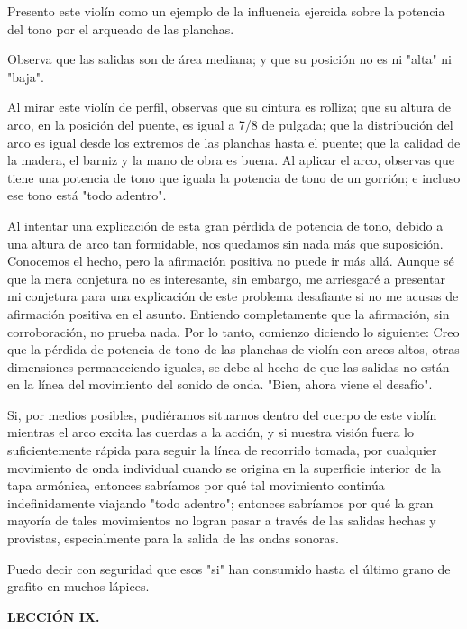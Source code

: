 \documentclass[12pt]{book}
\begin{document}
Presento este violín como un ejemplo de la influencia ejercida sobre la potencia del tono por el arqueado de las planchas.

Observa que las salidas son de área mediana; y que su posición no es ni "alta" ni "baja".

Al mirar este violín de perfil, observas que su cintura es rolliza; que su altura de arco, en la posición del puente, es igual a 7/8 de pulgada; que la distribución del arco es igual desde los extremos de las planchas hasta el puente; que la calidad de la madera, el barniz y la mano de obra es buena. Al aplicar el arco, observas que tiene una potencia de tono que iguala la potencia de tono de un gorrión; e incluso ese tono está "todo adentro".

Al intentar una explicación de esta gran pérdida de potencia de tono, debido a una altura de arco tan formidable, nos quedamos sin nada más que suposición. Conocemos el hecho, pero la afirmación positiva no puede ir más allá. Aunque sé que la mera conjetura no es interesante, sin embargo, me arriesgaré a presentar mi conjetura para una explicación de este problema desafiante si no me acusas de afirmación positiva en el asunto. Entiendo completamente que la afirmación, sin corroboración, no prueba nada. Por lo tanto, comienzo diciendo lo siguiente: Creo que la pérdida de potencia de tono de las planchas de violín con arcos altos, otras dimensiones permaneciendo iguales, se debe al hecho de que las salidas no están en la línea del movimiento del sonido de onda. "Bien, ahora viene el desafío".

Si, por medios posibles, pudiéramos situarnos dentro del cuerpo de este violín mientras el arco excita las cuerdas a la acción, y si nuestra visión fuera lo suficientemente rápida para seguir la línea de recorrido tomada, por cualquier movimiento de onda individual cuando se origina en la superficie interior de la tapa armónica, entonces sabríamos por qué tal movimiento continúa indefinidamente viajando "todo adentro"; entonces sabríamos por qué la gran mayoría de tales movimientos no logran pasar a través de las salidas hechas y provistas, especialmente para la salida de las ondas sonoras.

Puedo decir con seguridad que esos "si" han consumido hasta el último grano de grafito en muchos lápices.

\textbf{LECCIÓN IX.}
\end{document}
